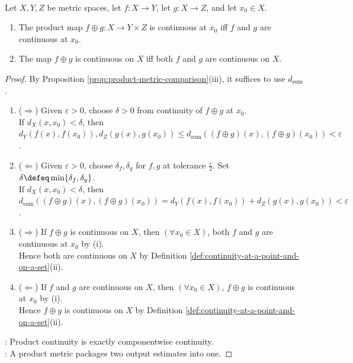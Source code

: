 \begin{proposition} \label{prop:product-map-continuity} \\
Let $X,Y,Z$ be metric spaces, let $f:X\to Y$, let $g:X\to Z$, and let $x_0\in X$.
\begin{enumerate}[label=(\roman*)]
\setlength{\itemsep}{0pt}
\item The product map $f\oplus g:X\to Y\times Z$ is continuous at $x_0$ iff $f$ and $g$ are continuous at $x_0$.
\item The map $f\oplus g$ is continuous on $X$ iff both $f$ and $g$ are continuous on $X$.
\end{enumerate}
\begin{proof}
By Proposition \ref{prop:product-metric-comparison}(iii), it suffices to use $d_{\mathrm{sum}}$.
\begin{enumerate}[label=(\roman*)]
\setlength{\itemsep}{0pt}
\item[$(i)$] ($\Rightarrow$) Given $\varepsilon>0$, choose $\delta>0$ from continuity of $f\oplus g$ at $x_0$.\\
If $d_X(x,x_0)<\delta$, then $d_Y(f(x),f(x_0)),d_Z(g(x),g(x_0))\leq d_{\mathrm{sum}}((f\oplus g)(x),(f\oplus g)(x_0))<\varepsilon$.
\item[$(i)$] ($\Leftarrow$) Given $\varepsilon>0$, choose $\delta_f,\delta_g$ for $f,g$ at tolerance $\frac{\varepsilon}{2}$. Set $\delta\defeq\min\{\delta_f,\delta_g\}$.\\
If $d_X(x,x_0)<\delta$, then $d_{\mathrm{sum}}((f\oplus g)(x),(f\oplus g)(x_0))=d_Y(f(x),f(x_0))+d_Z(g(x),g(x_0))<\varepsilon$.
\item[$(ii)$] ($\Rightarrow$) If $f\oplus g$ is continuous on $X$, then $(\forall x_0\in X)$, both $f$ and $g$ are continuous at $x_0$ by (i).\\
Hence both are continuous on $X$ by Definition \ref{def:continuity-at-a-point-and-on-a-set}(ii).
\item[$(ii)$] ($\Leftarrow$) If $f$ and $g$ are continuous on $X$, then $(\forall x_0\in X)$, $f\oplus g$ is continuous at $x_0$ by (i).\\
Hence $f\oplus g$ is continuous on $X$ by Definition \ref{def:continuity-at-a-point-and-on-a-set}(ii).
\end{enumerate}
: Product continuity is exactly componentwise continuity.\\
: A product metric packages two output estimates into one.
\end{proof}
\end{proposition}

